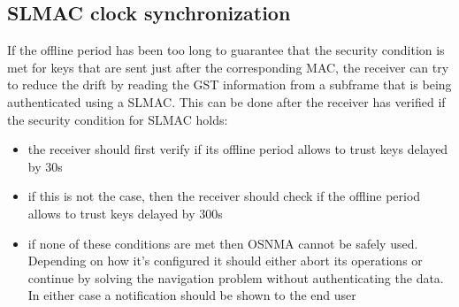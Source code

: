 \subsection{SLMAC clock synchronization}
If the offline period has been too long to guarantee that the security condition
is met for keys that are sent just after the corresponding MAC, the receiver can
try to reduce the drift by reading the GST information from a subframe that is
being authenticated using a SLMAC. This can be done after the receiver has
verified if the security condition for SLMAC holds:
\begin{itemize}
  \item the receiver should first verify if its offline period allows to trust
    keys delayed by \num{30}\si{s}
  \item if this is not the case, then the receiver should check if the offline
    period allows to trust keys delayed by \num{300}\si{s}
  \item if none of these conditions are met then OSNMA cannot be safely used.
    Depending on how it's configured it should either abort its operations or
    continue by solving the navigation problem without authenticating the data.
    In either case a notification should be shown to the end user
\end{itemize}

